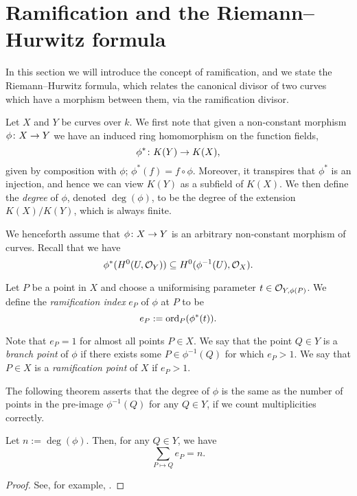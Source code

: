 \section{Ramification and the Riemann--Hurwitz formula}

In this section we will introduce the concept of ramification, and we state the Riemann--Hurwitz formula, which relates the canonical divisor of two curves which have a morphism between them, via the ramification divisor.



Let $X$ and $Y$ be curves over $k$.
We first note that given a non-constant morphism $\phi \colon X \rightarrow Y$ we have an induced ring homomorphism on the function fields,
    \[
    \phi^* \colon K(Y) \rightarrow K(X),
    \]
given by composition with $\phi$; \ie $\phi^*(f) = f \circ \phi$.
Moreover, it transpires that $\phi^*$ is an injection, and hence we can view $K(Y)$ as a subfield of $K(X)$.
We then define the \emph{degree} of $\phi$, denoted $\deg(\phi)$, to be the degree of the extension $K(X)/K(Y)$, which is always finite.

We henceforth assume that $\phi \colon X \rightarrow Y$ is an arbitrary non-constant morphism of curves.
Recall that we have
    \[
    \phi^*(H^0(U,{\cal O}_Y)) \subseteq H^0(\phi^{-1}(U),{\cal O}_X).
    \]

    \begin{defn}
    Let $P$ be a point in $X$ and choose a uniformising parameter $t \in {\cal O}_{Y,\phi(P)}$.
    We define the \emph{ramification index} $e_P$ of $\phi$ at $P$ to be
        \[
        e_P := \operatorname{ord}_P(\phi^*(t)).
        \]
    \end{defn}

Note that $e_P =1$ for almost all points $P \in X$.
We say that the point $Q \in Y$ is a \emph{branch point} of $\phi$ if there exists some $P \in \phi^{-1}(Q)$ for which $e_P >1$.
We say that $P \in X$ is a \emph{ramification point} of $X$ if $e_P >1$.

The following theorem asserts that the degree of $\phi$ is the same as the number of points in the pre-image $\phi^{-1}(Q)$ for any $Q \in Y$, if we count multiplicities correctly.

    \begin{thm}
    Let $n := \deg(\phi)$.
    Then, for any $Q \in Y$, we have 
        \[
        \sum_{P \mapsto Q} e_P = n.
        \]
    \end{thm}
    \begin{proof}
    See, for example, \cite[Pg.\ 290]{liu}.
    \end{proof}

